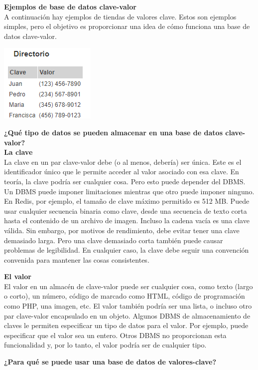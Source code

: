 \documentclass[twoside,onecolumn]{article}
\begin{document}
\begin{flushright}
\begin{itemize}
\textbf{Ejemplos de base de datos clave-valor}\\
A continuación hay ejemplos de tiendas de valores clave.
Estos son ejemplos simples, pero el objetivo es proporcionar una idea de cómo funciona una base de datos clave-valor.
\begin{center}
\includegraphics[scale=0.7]{Imagenes/ClaveValor.png}
\end{center}
\textbf{¿Qué tipo de datos se pueden almacenar en una base de datos clave-valor?}\\

\textbf{La clave}\\
La clave en un par clave-valor debe (o al menos, debería) ser única. Este es el identificador único que le permite acceder al valor asociado con esa clave.
En teoría, la clave podría ser cualquier cosa. Pero esto puede depender del DBMS. Un DBMS puede imponer limitaciones mientras que otro puede imponer ninguno.
En Redis, por ejemplo, el tamaño de clave máximo permitido es 512 MB. Puede usar cualquier secuencia binaria como clave, desde una secuencia de texto corta hasta el contenido de un archivo de imagen. Incluso la cadena vacía es una clave válida.
Sin embargo, por motivos de rendimiento, debe evitar tener una clave demasiado larga.
Pero una clave demasiado corta también puede causar problemas de legibilidad. En cualquier caso, la clave debe seguir una convención convenida para mantener las cosas consistentes.

\textbf{El valor}\\

El valor en un almacén de clave-valor puede ser cualquier cosa, como texto (largo o corto), un número, código de marcado como HTML, código de programación como PHP, una imagen, etc.
El valor también podría ser una lista, o incluso otro par clave-valor encapsulado en un objeto.
Algunos DBMS de almacenamiento de claves le permiten especificar un tipo de datos para el valor. Por ejemplo, puede especificar que el valor sea un entero. Otros DBMS no proporcionan esta funcionalidad y, por lo tanto, el valor podría ser de cualquier tipo.

\textbf{¿Para qué se puede usar una base de datos de valores-clave?}\\


\end{itemize}
\end{flushright}
\end{document}
